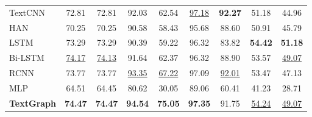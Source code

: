 \begin{table}[htb]
\begin{tabular}{lcccccccc}
    TextCNN                 & 72.81                   & 72.81                       & 92.03                   & 62.54                       & \underline{97.18}                   & \textbf{92.27}                       & 51.18                   & 44.96                        \\
    HAN                     & 70.25                   & 70.25                       & 90.58                   & 58.43                       & 95.68                   & 88.60                        & 50.91                   & 45.79                        \\
    LSTM                    & 73.29                   & 73.29                       & 90.39                   & 59.22                       & 96.32                   & 83.82                       & \textbf{54.42}                   & \textbf{51.18}                        \\
    Bi-LSTM                 & \underline{74.17}                   & \underline{74.13}                       & 91.64                   & 62.37                       & 96.32                   & 88.90                        & 53.57                   & \underline{49.07}                        \\
    RCNN                    & 73.77                   & 73.77                       & \underline{93.35}                   & \underline{67.22}                       & 97.09                   & \underline{92.01}                       &  53.47    & 47.13         \\
    MLP                     & 64.51                   & 64.45                       & 80.62                   & 30.05                       & 89.06                   & 60.41                       &41.23     & 28.71         \\
    \textbf{TextGraph}                  & \textbf{74.47}                   & \textbf{74.47}                       & \textbf{94.54}                   & \textbf{75.05}                       & \textbf{97.35}                   & 91.75                       &\underline{54.24}                   & \underline{49.07}                        \\
    \hline
    \end{tabular}
    \end{table}

